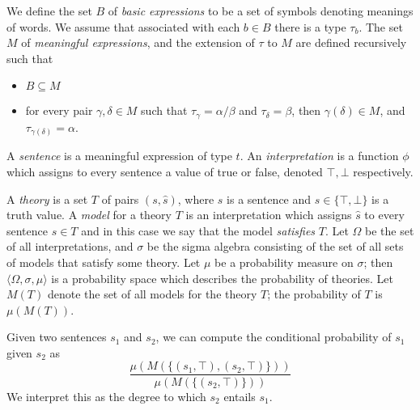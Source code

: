 \documentclass[letterpaper]{article}
\begin{document}
We define the set $B$ of \emph{basic expressions} to be a set of
symbols denoting meanings of words. We assume that associated with
each $b\in B$ there is a type $\tau_b$. The set $M$ of
\emph{meaningful expressions}, and the extension of $\tau$ to $M$ are
defined recursively such that
\begin{itemize}
\item $B\subseteq M$
\item for every pair $\gamma,\delta\in M$ such that $\tau_\gamma =
  \alpha/\beta$ and $\tau_\delta = \beta$, then $\gamma(\delta)\in
  M$, and $\tau_{\gamma(\delta)} = \alpha$.
\end{itemize}

A \emph{sentence} is a meaningful expression of type $t$. An
\emph{interpretation} is a function $\phi$ which assigns to every
sentence a value of true or false, denoted $\top, \bot$ respectively.

A \emph{theory} is a set $T$ of pairs $(s,\hat{s})$, where $s$ is a
sentence and $\hat{s}\in\{\top,\bot\}$ is a truth value. A
\emph{model} for a theory $T$ is an interpretation which assigns
$\hat{s}$ to every sentence $s\in T$ and in this case we say that the model \emph{satisfies} $T$. Let $\Omega$ be the set of all
interpretations, and $\sigma$ be the sigma algebra consisting of the
set of all sets of models that satisfy some theory. Let $\mu$ be a probability measure
on $\sigma$; then $\langle\Omega,\sigma,\mu\rangle$ is a probability
space which describes the probability of theories. Let $M(T)$ denote
the set of all models for the theory $T$; the probability of $T$ is
$\mu(M(T))$.

Given two sentences $s_1$ and $s_2$, we can compute the conditional
probability of $s_1$ given $s_2$ as
$$\frac{\mu(M(\{(s_1, \top), (s_2, \top)\}))}{\mu(M(\{(s_2,\top)\}))}$$
We interpret this as the degree to which $s_2$ entails $s_1$.

\end{document}
